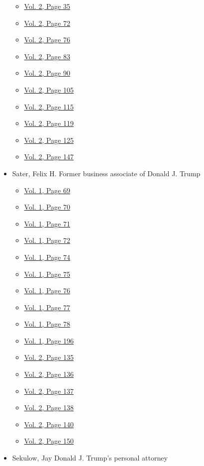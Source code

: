 \begin{itemize}
  \begin{itemize}
  \tightlist
  \item
    \protect\hyperlink{g-page-247}{Vol. 2, Page 35}
  \item
    \protect\hyperlink{g-page-284}{Vol. 2, Page 72}
  \item
    \protect\hyperlink{g-page-288}{Vol. 2, Page 76}
  \item
    \protect\hyperlink{g-page-295}{Vol. 2, Page 83}
  \item
    \protect\hyperlink{g-page-302}{Vol. 2, Page 90}
  \item
    \protect\hyperlink{g-page-317}{Vol. 2, Page 105}
  \item
    \protect\hyperlink{g-page-327}{Vol. 2, Page 115}
  \item
    \protect\hyperlink{g-page-331}{Vol. 2, Page 119}
  \item
    \protect\hyperlink{g-page-337}{Vol. 2, Page 125}
  \item
    \protect\hyperlink{g-page-359}{Vol. 2, Page 147}
  \end{itemize}
\item
  Sater, Felix H. Former business associate of Donald J. Trump

  \begin{itemize}
  \tightlist
  \item
    \protect\hyperlink{g-page-77}{Vol. 1, Page 69}
  \item
    \protect\hyperlink{g-page-78}{Vol. 1, Page 70}
  \item
    \protect\hyperlink{g-page-79}{Vol. 1, Page 71}
  \item
    \protect\hyperlink{g-page-80}{Vol. 1, Page 72}
  \item
    \protect\hyperlink{g-page-82}{Vol. 1, Page 74}
  \item
    \protect\hyperlink{g-page-83}{Vol. 1, Page 75}
  \item
    \protect\hyperlink{g-page-84}{Vol. 1, Page 76}
  \item
    \protect\hyperlink{g-page-85}{Vol. 1, Page 77}
  \item
    \protect\hyperlink{g-page-86}{Vol. 1, Page 78}
  \item
    \protect\hyperlink{g-page-204}{Vol. 1, Page 196}
  \item
    \protect\hyperlink{g-page-347}{Vol. 2, Page 135}
  \item
    \protect\hyperlink{g-page-348}{Vol. 2, Page 136}
  \item
    \protect\hyperlink{g-page-349}{Vol. 2, Page 137}
  \item
    \protect\hyperlink{g-page-350}{Vol. 2, Page 138}
  \item
    \protect\hyperlink{g-page-352}{Vol. 2, Page 140}
  \item
    \protect\hyperlink{g-page-362}{Vol. 2, Page 150}
  \end{itemize}
\item
  Sekulow, Jay Donald J. Trump's personal attorney


\end{itemize}
